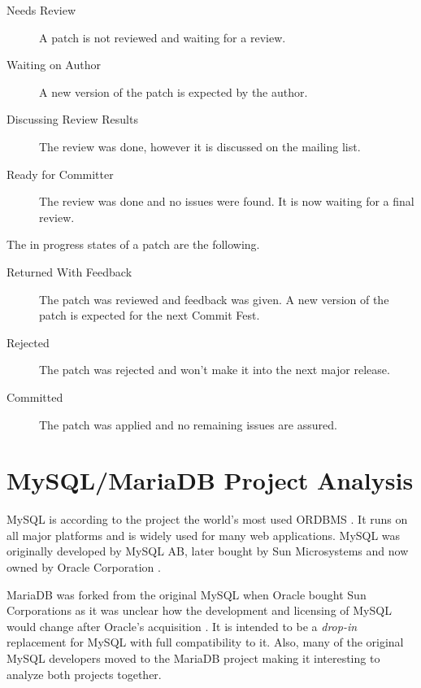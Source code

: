 \begin{description}

  \item[Needs Review] A patch is not reviewed and waiting for a review.

  \item[Waiting on Author] A new version of the patch is expected by the
    author.

  \item[Discussing Review Results] The review was done, however it is
    discussed on the mailing list.

  \item[Ready for Committer] The review was done and no issues were
    found. It is now waiting for a final review.

\end{description}

\noindent The in progress states of a patch are the following.

\begin{description}

  \item[Returned With Feedback] The patch was reviewed and feedback was
    given. A new version of the patch is expected for the next Commit Fest.

  \item[Rejected] The patch was rejected and won't make it into the next
    major release.

  \item[Committed] The patch was applied and no remaining issues are
    assured.

\end{description}


\section{MySQL/MariaDB Project Analysis} %


MySQL is according to the project the world's most used \ac{ORDBMS}
\cite{MySQLSun}. It runs on all major platforms and is widely used for many web
applications. MySQL was originally developed by MySQL AB, later bought by Sun
Microsystems and now owned by Oracle Corporation
\cite{MySQLSun,MySQLOracle,MySQLHistory}.

MariaDB was forked from the original MySQL when Oracle bought Sun Corporations
as it was unclear how the development and licensing of MySQL would change after
Oracle's acquisition \cite{MySQLAbout,MySQLBehind}. It is intended to be a
\emph{drop-in} replacement for MySQL with full compatibility to it. Also, many
of the original MySQL developers moved to the MariaDB project making it
interesting to analyze both projects together.

